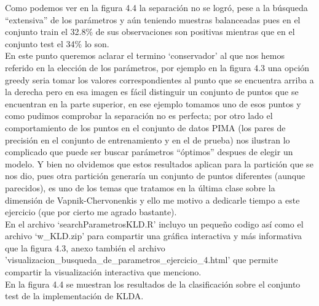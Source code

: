 \documentclass[paper=letter, fontsize=11pt]{scrartcl}
\numberwithin{equation}{section} %
\numberwithin{figure}{section} %
\numberwithin{table}{section} %
\begin{document}
Como podemos ver en la figura 4.4 la separación no se logró, pese a la búsqueda “extensiva” de los parámetros y aún teniendo muestras balanceadas pues en el conjunto train el 32.8\% de sus observaciones son positivas mientras que en el conjunto test el 34\% lo son.\\
En este punto queremos aclarar el termino ‘conservador’ al que nos hemos referido en la elección de los parámetros, por ejemplo en la figura 4.3 una opción greedy seria tomar los valores correspondientes al punto que se encuentra arriba a la derecha pero en esa imagen es fácil distinguir un conjunto de puntos que se encuentran en la parte superior, en ese ejemplo tomamos uno de esos puntos y como pudimos comprobar la separación no es perfecta; por otro lado el comportamiento de los puntos en el conjunto de datos PIMA (los pares de precisión en el conjunto de entrenamiento y en el de prueba) nos ilustran lo complicado que puede ser buscar parámetros “óptimos” despues de elegir un modelo. Y bien no olvidemos que estos resultados aplican para la partición que se nos dio, pues otra partición generaría un conjunto de puntos diferentes (aunque parecidos), es uno de los temas que tratamos en la última clase sobre la dimensión de Vapnik-Chervonenkis y ello me motivo a dedicarle tiempo a este ejercicio (que por cierto me agrado bastante).\\
En el archivo ‘searchParametrosKLD.R’ incluyo un pequeño codigo así como el archivo ‘w\_KLD.zip’ para compartir una gráfica interactiva y más informativa que la figura  4.3, anexo también el archivo 'visualizacion\_busqueda\_de\_parametros\_ejercicio\_4.html' que permite compartir la visualización interactiva que menciono.\\
En la figura 4.4 se muestran los resultados de la clasificación sobre el conjunto test de la implementación de KLDA.
\end{document}
